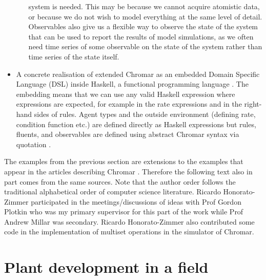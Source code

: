 \begin{itemize}
\begin{itemize}
    system is needed. This may be because we cannot acquire atomistic data, or
    because we do not wish to model everything at the same level of
    detail. Observables also give us a flexible way to observe the state of the
    system that can be used to report the results of model simulations, as we
    often need time series of some observable on the state of the system rather
    than time series of the state itself.
\end{itemize}
\item A concrete realisation of extended Chromar as an embedded Domain Specific
  Language (DSL) inside Haskell, a functional programming language
  \citep{gibbons_functional_2015}. The embedding means that we can use any valid
  Haskell expression where expressions are expected, for example in the rate
  expressions and in the right-hand sides of rules. Agent types and the outside
  environment (defining rate, condition function etc.) are defined directly as
  Haskell expressions but rules, fluents, and observables are defined using
  abstract Chromar syntax via quotation \citep{mainland_why_2007}.
\end{itemize}

The examples from the previous section are extensions to the examples that
appear in the articles describing Chromar \citep{honorato-zimmer_chromar_2017,
  honorato-zimmer_chromar_2018}. Therefore the following text also in part comes
from the same sources. Note that the author order follows the traditional
alphabetical order of computer science literature. Ricardo Honorato-Zimmer
participated in the meetings/discussions of ideas with Prof Gordon Plotkin who
was my primary supervisor for this part of the work while Prof Andrew Millar was
secondary. Ricardo Honorato-Zimmer also contributed some code in the
implementation of multiset operations in the simulator of Chromar.


\section{Plant development in a field}
\label{sec:plantDev}

